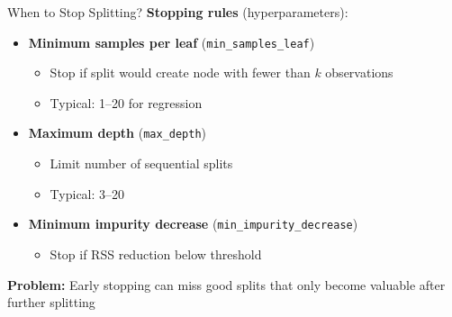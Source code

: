 \documentclass[10pt]{beamer}
\begin{document}

\begin{frame}{When to Stop Splitting?}
  \textbf{Stopping rules} (hyperparameters):

  \vspace{0.5em}
  \begin{itemize}
    \item \textbf{Minimum samples per leaf} (\texttt{min\_samples\_leaf})
    \begin{itemize}
      \item Stop if split would create node with fewer than $k$ observations
      \item Typical: 1--20 for regression
    \end{itemize}

    \vspace{0.5em}
    \item \textbf{Maximum depth} (\texttt{max\_depth})
    \begin{itemize}
      \item Limit number of sequential splits
      \item Typical: 3--20
    \end{itemize}

    \vspace{0.5em}
    \item \textbf{Minimum impurity decrease} (\texttt{min\_impurity\_decrease})
    \begin{itemize}
      \item Stop if RSS reduction below threshold
    \end{itemize}
  \end{itemize}

  \vspace{1em}
  \textbf{Problem:} Early stopping can miss good splits that only become valuable after further splitting
\end{frame}

\end{document}
